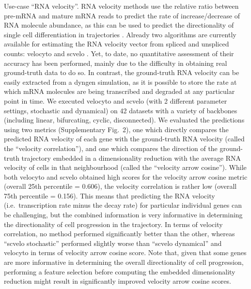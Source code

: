 \documentclass[
  table,
  10pt,
  a4paper]{article}
\begin{document}
Use-case ``RNA velocity''. RNA velocity methods use the relative ratio
between pre-mRNA and mature mRNA reads to predict the rate of
increase/decrease of RNA molecule abundance, as this can be used to
predict the directionality of single cell differentiation in
trajectories
\autocite{zeisel_coupledpremrnamrna_2011,lamanno_rnavelocitysingle_2018}.
Already two algorithms are currently available for estimating the RNA
velocity vector from spliced and unspliced counts: velocyto
\autocite{lamanno_rnavelocitysingle_2018} and scvelo
\autocite{bergen_generalizingrnavelocity_2020}. Yet, to date, no
quantitative assessment of their accuracy has been performed, mainly due
to the difficulty in obtaining real ground-truth data to do so. In
contrast, the ground-truth RNA velocity can be easily extracted from a
dyngen simulation, as it is possible to store the rate at which mRNA
molecules are being transcribed and degraded at any particular point in
time. We executed velocyto and scvelo (with 2 different parameter
settings, stochastic and dynamical) on 42 datasets with a variety of
backbones (including linear, bifurcating, cyclic, disconnected). We
evaluated the predictions using two metrics (Supplementary Fig.~2), one
which directly compares the predicted RNA velocity of each gene with the
ground-truth RNA velocity (called the ``velocity correlation''), and one
which compares the direction of the ground-truth trajectory embedded in
a dimensionality reduction with the average RNA velocity of cells in
that neighbourhood (called the ``velocity arrow cosine''). While both
velocyto and scvelo obtained high scores for the velocity arrow cosine
metric (overall 25th percentile = 0.606), the velocity correlation is
rather low (overall 75th percentile = 0.156). This means that predicting
the RNA velocity (i.e.~transcription rate minus the decay rate) for
particular individual genes can be challenging, but the combined
information is very informative in determining the directionality of
cell progression in the trajectory. In terms of velocity correlation, no
method performed significantly better than the other, whereas ``scvelo
stochastic'' performed slightly worse than ``scvelo dynamical'' and
velocyto in terms of velocity arrow cosine score. Note that, given that
some genes are more informative in determining the overall
directionality of cell progression, performing a feature selection
before computing the embedded dimensionality reduction might result in
significantly improved velocity arrow cosine scores.
\end{document}
